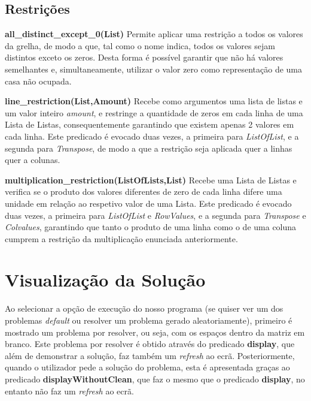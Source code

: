 \documentclass[11pt]{article}
\begin{document}
\subsection{Restrições}

\textbf{ all\_distinct\_except\_0(List)} Permite aplicar uma restrição a todos os valores da 
grelha, de modo a que, tal como o nome indica, todos os valores sejam distintos exceto os zeros. 
Desta forma é possível garantir que não há valores semelhantes e, simultaneamente, utilizar o 
valor zero como representação de uma casa não ocupada.

\bigskip

\textbf{line\_restriction(List,Amount)} Recebe como argumentos uma lista de listas e um valor 
inteiro \emph{amount}, e restringe a quantidade de zeros em cada linha de uma Lista de Listas,
 consequentemente garantindo que existem apenas 2 valores em cada linha. Este predicado é 
 evocado duas vezes, a primeira para \emph{ListOfList}, e a segunda para \emph{Transpose}, 
 de modo a que a restrição seja aplicada quer a linhas quer a colunas.

\bigskip

\textbf{multiplication\_restriction(ListOfLists,List)} Recebe uma Lista de Listas e verifica 
se o produto dos valores diferentes de zero de cada linha difere uma unidade em relação ao 
respetivo valor de uma Lista. Este predicado é evocado duas vezes, a primeira para 
\emph{ListOfList} e \emph{RowValues}, e a segunda para \emph{Transpose} e \emph{Colvalues}, 
garantindo que tanto o produto de uma linha como o de uma coluna cumprem a restrição da 
multiplicação enunciada anteriormente.

\pagebreak

\section{Visualização da Solução}

Ao selecionar a opção de execução do nosso programa (se quiser ver um dos problemas 
\textit{default} ou resolver um problema gerado aleatoriamente), primeiro é 
mostrado um problema por resolver, ou seja, com os espaços dentro da matriz em branco.
Este problema por resolver é obtido através do predicado \textbf{display}, que além
de demonstrar a solução, faz também um \textit{refresh} ao ecrã.
Posteriormente, quando o utilizador pede a solução do problema, esta é apresentada graças
ao predicado \textbf{displayWithoutClean}, que faz o mesmo que o predicado \textbf{display},
no entanto não faz um \textit{refresh} ao ecrã.
\end{document}
